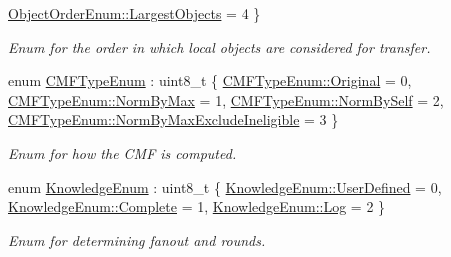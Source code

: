 \begin{DoxyCompactItemize}
\newline
\hyperlink{namespacevt_1_1vrt_1_1collection_1_1lb_a3c71e131f84e2ccbb95f43a1058c749ca58a14656ff3b03b4af0559d79b5ac566}{Object\+Order\+Enum\+::\+Largest\+Objects} = 4
 \}\begin{DoxyCompactList}\small\item\em Enum for the order in which local objects are considered for transfer. \end{DoxyCompactList}
\item 
enum \hyperlink{namespacevt_1_1vrt_1_1collection_1_1lb_ada1e381e6b19ba9f8277d4f698445404}{C\+M\+F\+Type\+Enum} \+: uint8\+\_\+t \{ \hyperlink{namespacevt_1_1vrt_1_1collection_1_1lb_ada1e381e6b19ba9f8277d4f698445404a0a52da7a03a6de3beefe54f8c03ad80d}{C\+M\+F\+Type\+Enum\+::\+Original} = 0, 
\hyperlink{namespacevt_1_1vrt_1_1collection_1_1lb_ada1e381e6b19ba9f8277d4f698445404a2a17cd13e37fb3cacfea703c5edc3680}{C\+M\+F\+Type\+Enum\+::\+Norm\+By\+Max} = 1, 
\hyperlink{namespacevt_1_1vrt_1_1collection_1_1lb_ada1e381e6b19ba9f8277d4f698445404a538edd88c8c3085ee0ee4337f25bc296}{C\+M\+F\+Type\+Enum\+::\+Norm\+By\+Self} = 2, 
\hyperlink{namespacevt_1_1vrt_1_1collection_1_1lb_ada1e381e6b19ba9f8277d4f698445404abaf94565ded5ad030ec19a9c5ab07d95}{C\+M\+F\+Type\+Enum\+::\+Norm\+By\+Max\+Exclude\+Ineligible} = 3
 \}\begin{DoxyCompactList}\small\item\em Enum for how the C\+MF is computed. \end{DoxyCompactList}
\item 
enum \hyperlink{namespacevt_1_1vrt_1_1collection_1_1lb_a72b44c7e6b2052509331d57b9c94c84a}{Knowledge\+Enum} \+: uint8\+\_\+t \{ \hyperlink{namespacevt_1_1vrt_1_1collection_1_1lb_a72b44c7e6b2052509331d57b9c94c84aac90d702da275c4b81b75a6a0163bc2bf}{Knowledge\+Enum\+::\+User\+Defined} = 0, 
\hyperlink{namespacevt_1_1vrt_1_1collection_1_1lb_a72b44c7e6b2052509331d57b9c94c84aaae94f80b3ce82062a5dd7815daa04f9d}{Knowledge\+Enum\+::\+Complete} = 1, 
\hyperlink{namespacevt_1_1vrt_1_1collection_1_1lb_a72b44c7e6b2052509331d57b9c94c84aace0be71e33226e4c1db2bcea5959f16b}{Knowledge\+Enum\+::\+Log} = 2
 \}\begin{DoxyCompactList}\small\item\em Enum for determining fanout and rounds. \end{DoxyCompactList}
\end{DoxyCompactItemize}
